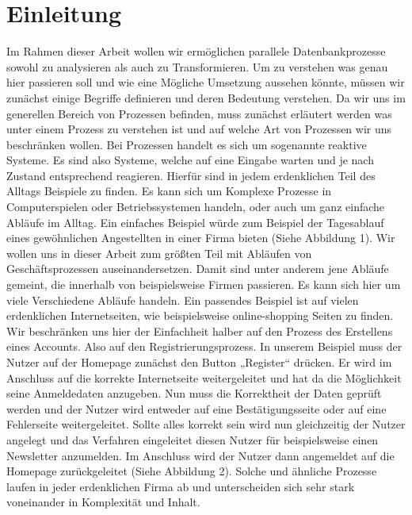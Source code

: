 

\chapter{Einleitung} %

\label{Chapter1} %


\newcommand{\keyword}[1]{\textbf{#1}}
\newcommand{\tabhead}[1]{\textbf{#1}}
\newcommand{\code}[1]{\texttt{#1}}
\newcommand{\file}[1]{\texttt{\bfseries#1}}
\newcommand{\option}[1]{\texttt{\itshape#1}}



Im Rahmen dieser Arbeit wollen wir ermöglichen parallele Datenbankprozesse sowohl zu analysieren als auch zu Transformieren. Um zu verstehen was genau hier passieren soll und wie eine Mögliche Umsetzung aussehen könnte, müssen wir zunächst einige Begriffe definieren und deren Bedeutung verstehen. Da wir uns im generellen Bereich von Prozessen befinden, muss zunächst erläutert werden was unter einem Prozess zu verstehen ist und auf welche Art von Prozessen wir uns beschränken wollen.
Bei Prozessen handelt es sich um sogenannte reaktive Systeme. Es sind also Systeme, welche auf eine Eingabe warten und je nach Zustand entsprechend reagieren. Hierfür sind in jedem erdenklichen Teil des Alltags Beispiele zu finden. Es kann sich um Komplexe Prozesse in Computerspielen oder Betriebssystemen handeln, oder auch um ganz einfache Abläufe im Alltag. Ein einfaches Beispiel würde zum Beispiel der Tagesablauf eines gewöhnlichen Angestellten in einer Firma bieten (Siehe Abbildung 1).
Wir wollen uns in dieser Arbeit zum größten Teil mit Abläufen von Geschäftsprozessen auseinandersetzen. Damit sind unter anderem jene Abläufe gemeint, die innerhalb von beispielsweise Firmen passieren. Es kann sich hier um viele Verschiedene Abläufe handeln. Ein passendes Beispiel ist auf vielen erdenklichen Internetseiten, wie beispielsweise online-shopping Seiten zu finden. Wir beschränken uns hier der Einfachheit halber auf den Prozess des Erstellens eines Accounts. Also auf den Registrierungsprozess. In unserem Beispiel muss der Nutzer auf der Homepage zunächst den Button „Register“ drücken. Er wird im Anschluss auf die korrekte Internetseite weitergeleitet und hat da die Möglichkeit seine Anmeldedaten anzugeben. Nun muss die Korrektheit der Daten geprüft werden und der Nutzer wird entweder auf eine Bestätigungsseite oder auf eine Fehlerseite weitergeleitet. Sollte alles korrekt sein wird nun gleichzeitig der Nutzer angelegt und das Verfahren eingeleitet diesen Nutzer für beispielsweise einen Newsletter anzumelden. Im Anschluss wird der Nutzer dann angemeldet auf die Homepage zurückgeleitet (Siehe Abbildung 2).
Solche und ähnliche Prozesse laufen in jeder erdenklichen Firma ab und unterscheiden sich sehr stark voneinander in Komplexität und Inhalt.




